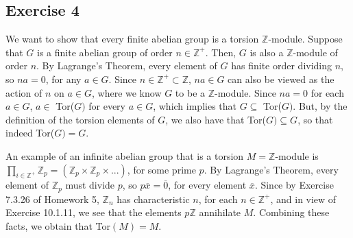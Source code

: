\subsection*{Exercise 4}
We want to show that every finite abelian group is a torsion $\mathbb{Z}$-module. Suppose that $G$ is a finite abelian group of order $n \in \mathbb{Z}^+$. Then, $G$ is also a $\mathbb{Z}$-module of order $n$. By Lagrange's Theorem, every element of $G$ has finite order dividing $n$, so $na = 0$, for any $a \in G$. Since $n \in \mathbb{Z}^+ \subset \mathbb{Z}$, $na \in G$ can also be viewed as the action of $n$ on $a \in G$, where we know $G$ to be a $\mathbb{Z}$-module. Since $na = 0$ for each $a \in G$, $a \in$ Tor($G)$ for every $a \in G$, which implies that $G \subseteq$ Tor($G)$. But, by the definition of the torsion elements of $G$, we also have that Tor($G) \subseteq G$, so that indeed Tor($G) = G$.

An example of an infinite abelian group that is a torsion $M = \mathbb{Z}$-module is $\prod_{i \in \mathbb{Z}^+} \mathbb{Z}_p = (\mathbb{Z}_p \times \mathbb{Z}_p \times ...)$, for some prime $p$. By Lagrange's Theorem, every element of $\mathbb{Z}_p$ must divide $p$, so $p\overline{x} = \overline{0}$, for every element $\overline{x}$. Since by Exercise 7.3.26 of Homework 5, $\mathbb{Z}_n$ has characteristic $n$, for each $n \in \mathbb{Z}^+$, and in view of Exercise 10.1.11, we see that the elements $p\mathbb{Z}$ annihilate $M$. Combining these facts, we obtain that Tor$(M) = M$.